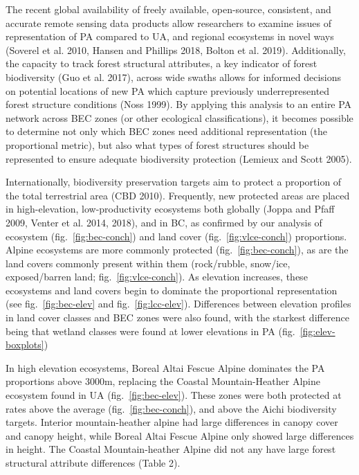 \documentclass[11pt]{article}
\begin{document}
The recent global availability of freely available, open-source,
consistent, and accurate remote sensing data products allow researchers
to examine issues of representation of PA compared to UA, and regional
ecosystems in novel ways (Soverel et al. 2010, Hansen and Phillips 2018,
Bolton et al. 2019). Additionally, the capacity to track forest
structural attributes, a key indicator of forest biodiversity (Guo et
al. 2017), across wide swaths allows for informed decisions on potential
locations of new PA which capture previously underrepresented forest
structure conditions (Noss 1999). By applying this analysis to an entire
PA network across BEC zones (or other ecological classifications), it
becomes possible to determine not only which BEC zones need additional
representation (the proportional metric), but also what types of forest
structures should be represented to ensure adequate biodiversity
protection (Lemieux and Scott 2005).

Internationally, biodiversity preservation targets aim to protect a
proportion of the total terrestrial area (CBD 2010). Frequently, new
protected areas are placed in high-elevation, low-productivity
ecosystems both globally (Joppa and Pfaff 2009, Venter et al. 2014,
2018), and in BC, as confirmed by our analysis of ecosystem
(fig.~\ref{fig:bec-conch}) and land cover (fig.~\ref{fig:vlce-conch})
proportions. Alpine ecosystems are more commonly protected
(fig.~\ref{fig:bec-conch}), as are the land covers commonly present
within them (rock/rubble, snow/ice, exposed/barren land;
fig.~\ref{fig:vlce-conch}). As elevation increases, these ecosystems and
land covers begin to dominate the proportional representation (see
fig.~\ref{fig:bec-elev} and fig.~\ref{fig:lcc-elev}). Differences
between elevation profiles in land cover classes and BEC zones were also
found, with the starkest difference being that wetland classes were
found at lower elevations in PA (fig.~\ref{fig:elev-boxplots})

In high elevation ecosystems, Boreal Altai Fescue Alpine dominates the
PA proportions above 3000m, replacing the Coastal Mountain-Heather
Alpine ecosystem found in UA (fig.~\ref{fig:bec-elev}). These zones were
both protected at rates above the average (fig.~\ref{fig:bec-conch}),
and above the Aichi biodiversity targets. Interior mountain-heather
alpine had large differences in canopy cover and canopy height, while
Boreal Altai Fescue Alpine only showed large differences in height. The
Coastal Mountain-heather Alpine did not any have large forest structural
attribute differences (Table 2).
\end{document}
